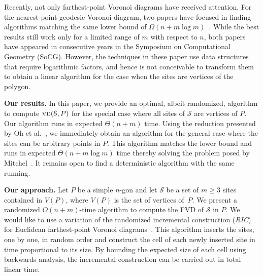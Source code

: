\documentclass[a4paper,UKenglish]{socg-lipics-v2018}
\newcommand{\s}{\mathcal S}
\newcommand{\vd}[2][P]{\textsc{vd}(#2, #1)}
\begin{document}
Recently, not only farthest-point Voronoi diagrams have received attention. 
For the nearest-point geodesic Voronoi diagram, two papers have focused in finding algorithms matching the same lower bound of $\Omega(n + m\log m)$~\cite{chihungVoronoi,oh2017voronoi}.
While the best results still work only for a limited range of $m$ with respect to $n$, both papers have appeared in consecutive years in the Symposium on Computational Geometry (SoCG).
However, the techniques in these paper use data structures that require logarithmic factors, and hence is not conceivable to transform them to obtain a linear algorithm for the case when the sites are vertices of the polygon. 

\textbf{Our results.} 
In this paper, we provide an optimal, albeit randomized, algorithm to compute $\vd{\s}$ for the special case where all sites of $\s$ are vertices of $P$.
Our algorithm runs in expected $\Theta(n + m)$ time. 
Using the reduction presented by Oh et al.~\cite{oh2016farthest}, we immediately obtain an algorithm for the general case where the sites can be arbitrary points in $P$.
This algorithm matches the lower bound and runs in expected $\Theta(n + m\log m)$ time thereby solving the problem posed by Mitchel~\cite[Chapter 27]{m-gspno-00}.
It remains open to find a deterministic algorithm with the same running.

\textbf{Our approach.}
Let  $P$ be a simple $n$-gon and let $\s$ be a set of $m\geq 3$ sites contained in $V(P)$, where $V(P)$ is the set of vertices of~$P$.
We present a randomized $O(n+m)$-time algorithm to compute the FVD of $\s$ in $P$.
We would like to use a variation of the randomized incremental construction (\emph{RIC}) for Euclidean farthest-point Voronoi diagrams~\cite{de2000computational}.
This algorithm inserts the sites, one by one, in random order and construct the cell of each newly inserted site in time proportional to its size. 
By bounding the expected size of each cell using backwards analysis, the incremental construction can be carried out in total linear time. 
\end{document}
